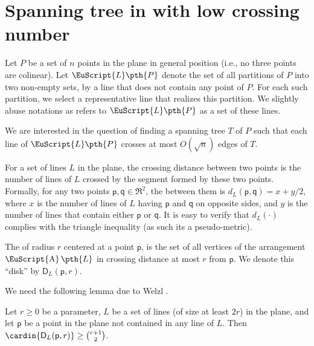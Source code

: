 \documentclass[12pt]{article}
\newcommand{\PntSet}{P}
\newcommand{\LinesX}[1]{\EuScript{L}\pth{#1}}
\newcommand{\pnt}{\mathsf{p}}
\newcommand{\pntA}{\mathsf{q}}
\newcommand{\ArrX}[1]{\mathop{\mathrm{\EuScript{A}}}\pth{#1}}
\newcommand{\dCr}[2]{d_{#1}(#2)}
\newcommand{\diskCr}[2]{\mathsf{D}_{#1}(#2)}
\newcommand{\LineSet}{L}
\begin{document}
\section{Spanning tree in  with low crossing number}

Let $\PntSet$ be a set of $n$ points in the plane in general position
(i.e., no three points are colinear). Let $\LinesX{\PntSet}$ denote
the set of all partitions of $\PntSet$ into two non-empty sets, by a
line that does not contain any point of $\PntSet$. For each such
partition, we select a representative line that realizes this
partition. We slightly abuse notations as refers to $\LinesX{\PntSet}$
as a set of these lines.

We are interested in the question of finding a spanning tree $T$ of
$\PntSet$ such that each line of $\LinesX{\PntSet}$ crosses at most
$O(\sqrt{n})$ edges of $T$.





\begin{defn}
    For a set of lines $\LineSet$ in the plane, the crossing distance
    between two points is the number of lines of $\LineSet$ crossed by
    the segment formed by these two points. Formally, for any two
    points $\pnt, \pntA \in \Re^2$, the 
    between them is $\dCr{\LineSet}{\pnt, \pntA} = x+y/2$, where $x$
    is the number of lines of $\LineSet$ having $\pnt$ and $\pntA$ on
    opposite sides, and $y$ is the number of lines that contain either
    $\pnt$ or $\pntA$. It is easy to verify that
    $\dCr{\LineSet}{\cdot}$ complies with the triangle inequality (as
    such its a pseudo-metric).
    
    The  of radius $r$ centered at a point
    $\pnt$, is the set of all vertices of the arrangement 
    $\ArrX{\LineSet}$ in crossing distance at most $r$ from $\pnt$. We
    denote this ``disk'' by $\diskCr{\LineSet}{\pnt,r}$.
\end{defn}

We need the following lemma due to Welzl \cite{w-stlcn-92}.
\begin{lemma}
    Let $r\geq 0$ be a parameter, $\LineSet$ be a set of lines (of
    size at least $2r$) in the plane, and let $\pnt$ be a point in the
    plane not contained in any line of $\LineSet$. Then
    $\cardin{\diskCr{\LineSet}{\pnt, r}} \geq \binom{r+1}{2}$.

\end{lemma}
\end{document}
